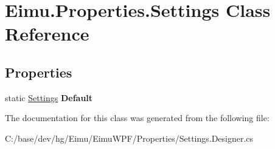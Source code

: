 \hypertarget{class_eimu_1_1_properties_1_1_settings}{
\section{Eimu.Properties.Settings Class Reference}
\label{class_eimu_1_1_properties_1_1_settings}
}
\subsection*{Properties}
\begin{DoxyCompactItemize}
\item 
\hypertarget{class_eimu_1_1_properties_1_1_settings_aaa24c2b994b9ebb58ee003462c5d65b8}{
static \hyperlink{class_eimu_1_1_properties_1_1_settings}{Settings} {\bfseries Default}}
\label{class_eimu_1_1_properties_1_1_settings_aaa24c2b994b9ebb58ee003462c5d65b8}

\end{DoxyCompactItemize}


The documentation for this class was generated from the following file:\begin{DoxyCompactItemize}
\item 
C:/base/dev/hg/Eimu/EimuWPF/Properties/Settings.Designer.cs\end{DoxyCompactItemize}
